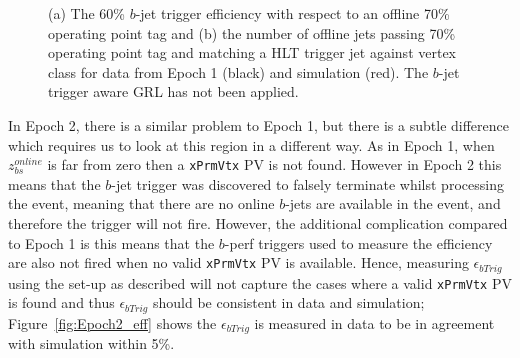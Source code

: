 \begin{figure}[!ht]
\begin{center}
    \end{center}
  \caption{(a) The 60\% $b$-jet trigger efficiency with respect to an offline 70\% operating point tag
    and  (b) the number of offline jets passing 70\% operating point tag and matching a HLT trigger jet
    against vertex class for data from Epoch 1 (black) and simulation (red). 
    The $b$-jet trigger aware GRL has not been applied.}
    \label{fig:Epoch1_vtxClass}
\end{figure}

\FloatBarrier



In Epoch 2, there is a similar problem to Epoch 1, but there is a subtle difference which requires us to look at this region in a
different way.
As in Epoch 1, when  $z_{bs}^{online}$ is far from zero then a \verb|xPrmVtx| PV is not found.
However in Epoch 2 this means that the  $b$-jet trigger was discovered to falsely terminate whilst processing the event,
meaning that there are no online $b$-jets are available in the event, and therefore the trigger will not fire.
However, the additional complication compared to Epoch 1 is this means that the  $b$-perf triggers used to measure the efficiency
are also not fired when no valid \verb|xPrmVtx| PV is available.
Hence, measuring $\epsilon_{bTrig}$ using the set-up as described will not capture the cases where a valid \verb|xPrmVtx| PV is found
and thus $\epsilon_{bTrig}$ should be consistent in data and simulation;
Figure~\ref{fig:Epoch2_eff} shows the $\epsilon_{bTrig}$ is measured in data to be in agreement with simulation within 5\%.


